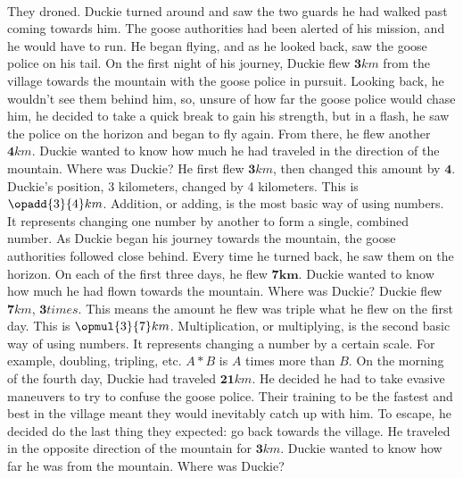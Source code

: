 \paragraph{} They droned. Duckie turned around and saw the two guards he had walked past coming towards him. The goose authorities had been alerted of his mission, and he would have to run. He began flying, and as he looked back, saw the goose police on his tail. 
\vfill
\pagebreak
{On the first night of his journey, Duckie flew $\mathbf{3} km$ from the village towards the mountain with the goose police in pursuit. Looking back, he wouldn't see them behind him, so, unsure of how far the goose police would chase him, he decided to take a quick break to gain his strength, but in a flash, he saw the police on the horizon and began to fly again. From there, he flew another $\mathbf{4} km$. Duckie wanted to know how much he had traveled in the direction of the mountain. Where was Duckie?}
{He first flew $\mathbf{3} km$, then changed this amount by $\mathbf{4}$. Duckie's position, 3 kilometers, changed by 4 kilometers. This is $\opadd{3}{4} km$.}
{Addition, or adding, is the most basic way of using numbers. It represents changing one number by another to form a single, combined number.} 
{}
{As Duckie began his journey towards the mountain, the goose authorities followed close behind. Every time he turned back, he saw them on the horizon. On each of the first three days, he flew $\mathbf{7km}$. Duckie wanted to know how much he had flown towards the mountain. Where was Duckie?}
{Duckie flew $\mathbf{7} km$, $\mathbf{3} times$. This means the amount he flew was triple what he flew on the first day. This is $\opmul{3}{7} km$.}
{Multiplication, or multiplying, is the second basic way of using numbers. It represents changing a number by a certain scale. For example, doubling, tripling, etc. $A\ast B$ is $A$ times more than $B$.}
{}
{On the morning of the fourth day, Duckie had traveled $\mathbf{21} km$. He decided he had to take evasive maneuvers to try to confuse the goose police. Their training to be the fastest and best in the village meant they would inevitably catch up with him. To escape, he decided do the last thing they expected: go back towards the village. He traveled in the opposite direction of the mountain for $\mathbf{3} km$. Duckie wanted to know how far he was from the mountain. Where was Duckie?}
